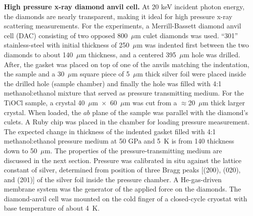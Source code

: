 \documentclass[preprint,superscriptaddress,amsmath,amssymb,aps,prl]{revtex4-1}
\begin{document}
\textbf{High pressure x-ray diamond anvil cell.} At 20 keV incident photon energy, the diamonds are nearly transparent, making it ideal for high pressure x-ray scattering measurements. For the experiments, a Merrill-Bassett diamond anvil cell (DAC) consisting of two opposed 800~${\mu}$m culet diamonds was used. ``301'' stainless-steel with initial thickness of 250~${\mu}$m was indented first between the two diamonds to about 140~${\mu}$m thickness, and a centered 395~${\mu}$m hole was drilled. After, the gasket was placed on top of one of the anvils matching the indentation, the sample and a 30~${\mu}$m square piece of 5~${\mu}$m thick silver foil were placed inside the drilled hole (sample chamber) and finally the hole was filled with 4:1 methanol:ethanol mixture that served as pressure transmitting medium. For the TiOCl sample, a crystal 40~${\mu}$m~$\times$~60~${\mu}$m was cut from a $\approx$20~${\mu}$m thick larger crystal. When loaded, the $ab$ plane of the sample was parallel with the diamond's culets. A Ruby chip was placed in the chamber for loading pressure measurement. The expected change in thickness of the indented gasket filled with 4:1 methanol:ethanol pressure medium at 50 GPa and 5~K is from 140 thickness down to 50~${\mu}$m. The properties of the pressure-transmitting medium are discussed in the next section. Pressure was calibrated in situ against the lattice constant of silver, determined from position of three Bragg peaks [(200), (020), and (201)] of the silver foil inside the pressure chamber. A He-gas-driven membrane system was the generator of the applied force on the diamonds. The diamond-anvil cell was mounted on the cold finger of a closed-cycle cryostat with base temperature of about 4~K.
\end{document}
